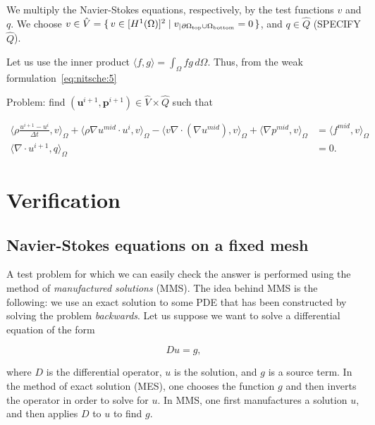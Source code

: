 \documentclass[11pt,a4paper,titlepage]{report}
\begin{document}
We multiply the Navier-Stokes equations, respectively, by the test functions $v$ and $q$. We choose $v \in \hat{V} = \set{v \in [H^1(\Omega)]^2 | v_|{_{\partial \Omega_{\rm top} \cup \Omega_{\rm bottom}}} = 0}$, and $q \in \hat{Q}$ (SPECIFY $\hat{Q}$).


Let us use the inner product $\langle f,g \rangle = \int_{\Omega} fg \, d\Omega$. Thus, from the weak formulation~\eqref{eq:nitsche:5}

Problem: find $(\mathbf{u}^{i+1}, \mathbf{p}^{i+1}) \in \hat{V} \times \hat{Q}$ such that

\begin{align}
\langle \rho \frac{u^{i+1} - u^i}{\Delta t},v \rangle_\Omega
+ \langle \rho \nabla u^{mid} \cdot u^i  ,v \rangle_\Omega
- \langle v \nabla \cdot (\nabla u^{mid}) ,v \rangle_\Omega
+ \langle \nabla p^{mid} ,v \rangle_\Omega & = \langle f^{mid} ,v \rangle_\Omega \\
\langle \nabla \cdot u^{i+1},q \rangle_\Omega &=0 .
\end{align}



\chapter{Verification}

\section{Navier-Stokes equations on a fixed mesh}



A test problem for which we can easily check the answer is performed using the method of \textit{manufactured solutions} (MMS). The idea behind MMS is the following: we use an exact solution to some PDE that has been constructed by solving the problem \textit{backwards}. Let us suppose we want to solve a differential equation of the form

\[
Du = g,
\]

where $D$ is the differential operator, $u$ is the solution, and $g$ is a source term. In the method of exact solution (MES), one chooses the function $g$ and then inverts the operator in order to solve for $u$. In MMS, one first manufactures a solution $u$, and then applies $D$ to $u$ to find $g$. \\
\end{document}
